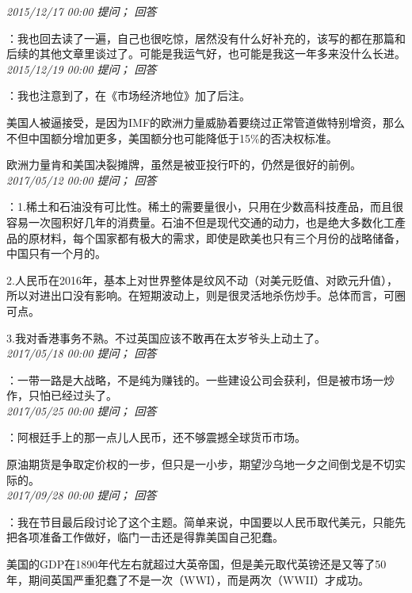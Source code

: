 \documentclass[twocolumn]{ctexart}
\begin{document}
\textit{\hfill\noindent\small 2015/12/17 00:00 提问； 回答}

：我也回去读了一遍，自己也很吃惊，居然没有什么好补充的，该写的都在那篇和后续的其他文章里谈过了。可能是我运气好，也可能是我这一年多来没什么长进。\\

\textit{\hfill\noindent\small 2015/12/19 00:00 提问； 回答}

：我也注意到了，在《市场经济地位》加了后注。

美国人被逼接受，是因为IMF的欧洲力量威胁着要绕过正常管道做特别增资，那么不但中国额分增加更多，美国额分也可能降低于15\%的否决权标准。

欧洲力量肯和美国决裂摊牌，虽然是被亚投行吓的，仍然是很好的前例。\\

\textit{\hfill\noindent\small 2017/05/12 00:00 提问； 回答}

：1.稀土和石油没有可比性。稀土的需要量很小，只用在少数高科技產品，而且很容易一次囤积好几年的消费量。石油不但是现代交通的动力，也是绝大多数化工產品的原材料，每个国家都有极大的需求，即使是欧美也只有三个月份的战略储备，中国只有一个月的。

2.人民币在2016年，基本上对世界整体是纹风不动（对美元贬值、对欧元升值），所以对进出口没有影响。在短期波动上，则是很灵活地杀伤炒手。总体而言，可圈可点。

3.我对香港事务不熟。不过英国应该不敢再在太岁爷头上动土了。\\

\textit{\hfill\noindent\small 2017/05/18 00:00 提问； 回答}

：一带一路是大战略，不是纯为赚钱的。一些建设公司会获利，但是被市场一炒作，只怕已经过头了。\\

\textit{\hfill\noindent\small 2017/05/25 00:00 提问； 回答}

：阿根廷手上的那一点儿人民币，还不够震撼全球货币市场。

原油期货是争取定价权的一步，但只是一小步，期望沙乌地一夕之间倒戈是不切实际的。\\

\textit{\hfill\noindent\small 2017/09/28 00:00 提问； 回答}

：我在节目最后段讨论了这个主题。简单来说，中国要以人民币取代美元，只能先把各项准备工作做好，临门一击还是得靠美国自己犯蠢。

美国的GDP在1890年代左右就超过大英帝国，但是美元取代英镑还是又等了50年，期间英国严重犯蠢了不是一次（WWI），而是两次（WWII）才成功。\\
\end{document}
